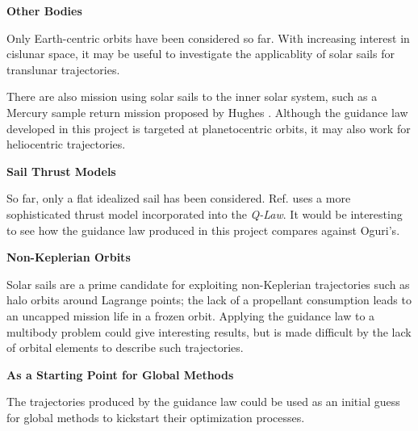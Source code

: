 \textbf{Other Bodies}

Only Earth-centric orbits have been considered so far. With increasing interest in cislunar space, it may be useful to investigate the applicablity of solar sails for translunar trajectories.

There are also mission using solar sails to the inner solar system, such as a Mercury sample return mission proposed by Hughes \cite{hughes2006sample}. Although the guidance law developed in this project is targeted at planetocentric orbits, it may also work for heliocentric trajectories.

\textbf{Sail Thrust Models}

So far, only a flat idealized sail has been considered. Ref. \cite{oguri2023solar} uses a more sophisticated thrust model incorporated into the \textit{\textit{Q-Law}}. It would be interesting to see how the guidance law produced in this project compares against Oguri's.

\textbf{Non-Keplerian Orbits}

Solar sails are a prime candidate for exploiting non-Keplerian trajectories such as halo orbits around Lagrange points; the lack of a propellant consumption leads to an uncapped mission life in a frozen orbit. Applying the guidance law to a multibody problem could give interesting results, but is made difficult by the lack of orbital elements to describe such trajectories.

\textbf{As a Starting Point for Global Methods}

The trajectories produced by the guidance law could be used as an initial guess for global methods to kickstart their optimization processes.